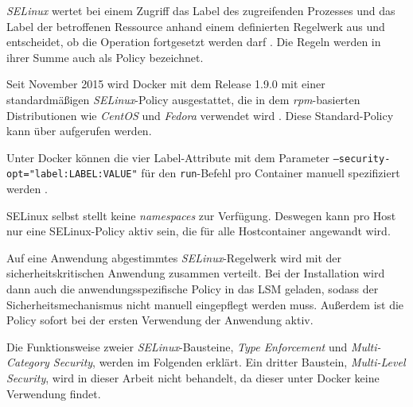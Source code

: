 \documentclass[../main.tex]{subfiles}
\begin{document}
{				\emph{SELinux} wertet bei einem Zugriff das Label des zugreifenden Prozesses und das Label der betroffenen Ressource anhand einem definierten Regelwerk aus und entscheidet, ob die Operation fortgesetzt werden darf \cite{linuxSecOverview}. Die Regeln werden in ihrer Summe auch als Policy bezeichnet.

				Seit November 2015 wird Docker mit dem Release 1.9.0 mit einer standardmäßigen \emph{SELinux}-Policy ausgestattet, die in dem \emph{rpm}-basierten Distributionen wie \emph{CentOS} und \emph{Fedora} verwendet wird \cite{githubDockerChangelog}\cite{githubSELinuxPolicyIssue}. Diese Standard-Policy kann über \cite{githubSELinuxProfile} aufgerufen werden.

				Unter Docker können die vier Label-Attribute mit dem Parameter \texttt{--security-opt="label:LABEL:VALUE"} für den \texttt{run}-Befehl pro Container manuell spezifiziert werden \cite{dockerRun}.


				SELinux selbst stellt keine \emph{namespaces} zur Verfügung. Deswegen kann pro Host nur eine SELinux-Policy aktiv sein, die für alle Hostcontainer angewandt wird.

				Auf eine Anwendung abgestimmtes \emph{SELinux}-Regelwerk wird mit der sicherheitskritischen Anwendung zusammen verteilt. Bei der Installation wird dann auch die anwendungsspezifische Policy in das LSM geladen, sodass der Sicherheitsmechanismus nicht manuell eingepflegt werden muss. Außerdem ist die Policy sofort bei der ersten Verwendung der Anwendung aktiv.

				Die Funktionsweise zweier \emph{SELinux}-Bausteine, \emph{Type Enforcement} und \emph{Multi-Category Security}, werden im Folgenden erklärt. Ein dritter Baustein, \emph{Multi-Level Security}, wird in dieser Arbeit nicht behandelt, da dieser unter Docker keine Verwendung findet.



}
\end{document}

